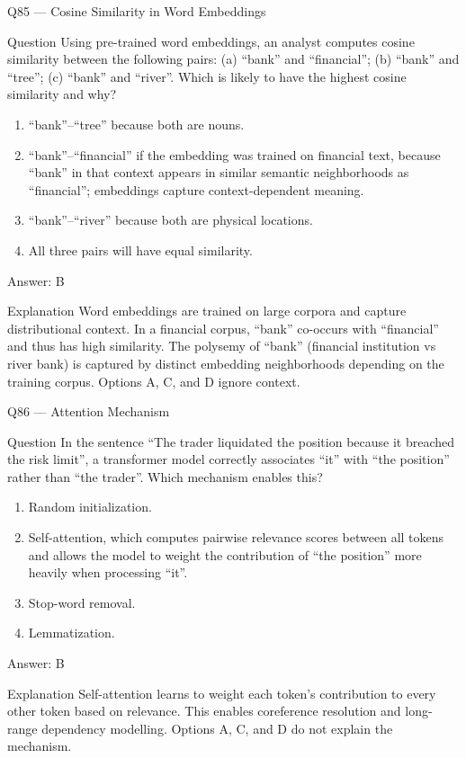 \documentclass[aspectratio=169,8pt]{beamer}
\begin{document}
\begin{frame}{Q85 --- Cosine Similarity in Word Embeddings}
\begin{block}{Question}
Using pre-trained word embeddings, an analyst computes cosine similarity between the following pairs: (a) ``bank'' and ``financial''; (b) ``bank'' and ``tree''; (c) ``bank'' and ``river''. Which is likely to have the highest cosine similarity and why?
\end{block}
\begin{enumerate}
\item ``bank''--``tree'' because both are nouns.
\item ``bank''--``financial'' if the embedding was trained on financial text, because ``bank'' in that context appears in similar semantic neighborhoods as ``financial''; embeddings capture context-dependent meaning.
\item ``bank''--``river'' because both are physical locations.
\item All three pairs will have equal similarity.
\end{enumerate}
\begin{exampleblock}{Answer: B}\end{exampleblock}
\begin{block}{Explanation}
Word embeddings are trained on large corpora and capture distributional context. In a financial corpus, ``bank'' co-occurs with ``financial'' and thus has high similarity. The polysemy of ``bank'' (financial institution vs river bank) is captured by distinct embedding neighborhoods depending on the training corpus. Options A, C, and D ignore context.
\end{block}
\end{frame}

\begin{frame}{Q86 --- Attention Mechanism}
\begin{block}{Question}
In the sentence ``The trader liquidated the position because it breached the risk limit'', a transformer model correctly associates ``it'' with ``the position'' rather than ``the trader''. Which mechanism enables this?
\end{block}
\begin{enumerate}
\item Random initialization.
\item Self-attention, which computes pairwise relevance scores between all tokens and allows the model to weight the contribution of ``the position'' more heavily when processing ``it''.
\item Stop-word removal.
\item Lemmatization.
\end{enumerate}
\begin{exampleblock}{Answer: B}\end{exampleblock}
\begin{block}{Explanation}
Self-attention learns to weight each token's contribution to every other token based on relevance. This enables coreference resolution and long-range dependency modelling. Options A, C, and D do not explain the mechanism.
\end{block}
\end{frame}
\end{document}
